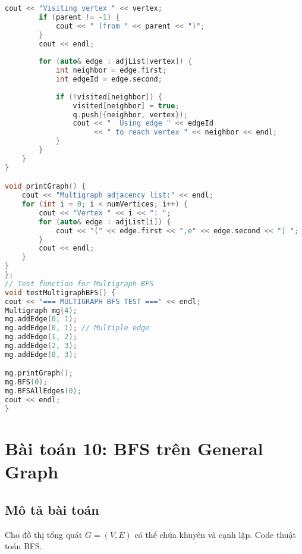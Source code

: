 \documentclass[12pt]{article}
\begin{document}
\begin{lstlisting}[language=C++, caption=BFS cho Multigraph]
        cout << "Visiting vertex " << vertex;
        if (parent != -1) {
            cout << " (from " << parent << ")";
        }
        cout << endl;
        
        for (auto& edge : adjList[vertex]) {
            int neighbor = edge.first;
            int edgeId = edge.second;
            
            if (!visited[neighbor]) {
                visited[neighbor] = true;
                q.push({neighbor, vertex});
                cout << "  Using edge " << edgeId 
                     << " to reach vertex " << neighbor << endl;
            }
        }
    }
}

void printGraph() {
    cout << "Multigraph adjacency list:" << endl;
    for (int i = 0; i < numVertices; i++) {
        cout << "Vertex " << i << ": ";
        for (auto& edge : adjList[i]) {
            cout << "(" << edge.first << ",e" << edge.second << ") ";
        }
        cout << endl;
    }
}
};
// Test function for Multigraph BFS
void testMultigraphBFS() {
cout << "=== MULTIGRAPH BFS TEST ===" << endl;
Multigraph mg(4);
mg.addEdge(0, 1);
mg.addEdge(0, 1); // Multiple edge
mg.addEdge(1, 2);
mg.addEdge(2, 3);
mg.addEdge(0, 3);

mg.printGraph();
mg.BFS(0);
mg.BFSAllEdges(0);
cout << endl;
}
\end{lstlisting}
\section{Bài toán 10: BFS trên General Graph}
\subsection{Mô tả bài toán}
Cho đồ thị tổng quát $G = (V, E)$ có thể chứa khuyên và cạnh lặp. Code thuật toán BFS.
\end{document}
